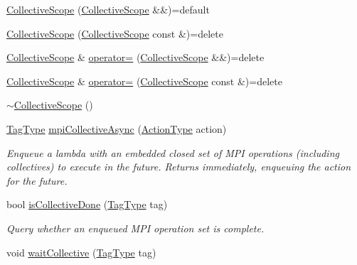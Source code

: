 \begin{DoxyCompactItemize}
\item 
\hyperlink{structvt_1_1collective_1_1_collective_scope_ac0f36175489c3afa6d751813cb6f9286}{Collective\+Scope} (\hyperlink{structvt_1_1collective_1_1_collective_scope}{Collective\+Scope} \&\&)=default
\item 
\hyperlink{structvt_1_1collective_1_1_collective_scope_a9781b1b86796d271cc9407eb8034851f}{Collective\+Scope} (\hyperlink{structvt_1_1collective_1_1_collective_scope}{Collective\+Scope} const \&)=delete
\item 
\hyperlink{structvt_1_1collective_1_1_collective_scope}{Collective\+Scope} \& \hyperlink{structvt_1_1collective_1_1_collective_scope_a4a756e93437119e20a72dfe0d9ede190}{operator=} (\hyperlink{structvt_1_1collective_1_1_collective_scope}{Collective\+Scope} \&\&)=delete
\item 
\hyperlink{structvt_1_1collective_1_1_collective_scope}{Collective\+Scope} \& \hyperlink{structvt_1_1collective_1_1_collective_scope_ae211d02b75ae45834e25eb1cd8c2f7d0}{operator=} (\hyperlink{structvt_1_1collective_1_1_collective_scope}{Collective\+Scope} const \&)=delete
\item 
\hyperlink{structvt_1_1collective_1_1_collective_scope_a0b8d9664cdc7f94bed4b17e0eb5c2b77}{$\sim$\+Collective\+Scope} ()
\item 
\hyperlink{namespacevt_a84ab281dae04a52a4b243d6bf62d0e52}{Tag\+Type} \hyperlink{structvt_1_1collective_1_1_collective_scope_ad116d0b00f28b79dbf7c4b0e5c4ed4a1}{mpi\+Collective\+Async} (\hyperlink{namespacevt_ae0a5a7b18cc99d7b732cb4d44f46b0f3}{Action\+Type} action)
\begin{DoxyCompactList}\small\item\em Enqueue a lambda with an embedded closed set of M\+PI operations (including collectives) to execute in the future. Returns immediately, enqueuing the action for the future. \end{DoxyCompactList}\item 
bool \hyperlink{structvt_1_1collective_1_1_collective_scope_acc386201ec9e82dbe2691b4ce528a4c2}{is\+Collective\+Done} (\hyperlink{namespacevt_a84ab281dae04a52a4b243d6bf62d0e52}{Tag\+Type} tag)
\begin{DoxyCompactList}\small\item\em Query whether an enqueued M\+PI operation set is complete. \end{DoxyCompactList}\item 
void \hyperlink{structvt_1_1collective_1_1_collective_scope_afae2807ff3adc0f1d6772411168064f9}{wait\+Collective} (\hyperlink{namespacevt_a84ab281dae04a52a4b243d6bf62d0e52}{Tag\+Type} tag)

\end{DoxyCompactItemize}
